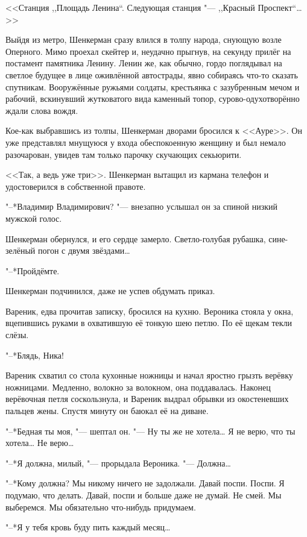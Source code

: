 <<Станция ,,Площадь Ленина``. Следующая станция "--- ,,Красный Проспект``\dots>>

Выйдя из метро, Шенкерман сразу влился в толпу народа, снующую возле Оперного.
Мимо проехал скейтер и, неудачно прыгнув, на секунду прилёг на постамент памятника Ленину.
Ленин же, как обычно, гордо поглядывал на светлое будущее в лице оживлённой автострады, явно собираясь что-то сказать спутникам.
Вооружённые ружьями солдаты, крестьянка с зазубренным мечом и рабочий, вскинувший жутковатого вида каменный топор, сурово-одухотворённо ждали слова вождя.

Кое-как выбравшись из толпы, Шенкерман дворами бросился к <<Ауре>>.
Он уже представлял мнущуюся у входа обеспокоенную женщину и был немало разочарован, увидев там только парочку скучающих секьюрити.

<<Так, а ведь уже три>>.
Шенкерман вытащил из кармана телефон и удостоверился в собственной правоте.

"--*Владимир Владимирович? "--- внезапно услышал он за спиной низкий мужской голос.

Шенкерман обернулся, и его сердце замерло.
Светло-голубая рубашка, сине-зелёный погон с двумя звёздами\dots{}

"--*Пройдёмте.

Шенкерман подчинился, даже не успев обдумать приказ.

\asterism

Вареник, едва прочитав записку, бросился на кухню.
Вероника стояла у окна, вцепившись руками в охватившую её тонкую шею петлю.
По её щекам текли слёзы.

"--*Блядь, Ника!

Вареник схватил со стола кухонные ножницы и начал яростно грызть верёвку ножницами.
Медленно, волокно за волокном, она поддавалась.
Наконец верёвочная петля соскользнула, и Вареник выдрал обрывки из окостеневших пальцев жены.
Спустя минуту он баюкал её на диване.

"--*Бедная ты моя, "--- шептал он.
"--- Ну ты же не хотела\dots{}
Я не верю, что ты хотела\dots{}
Не верю\dots{}

"--*Я должна, милый, "--- прорыдала Вероника.
"--- Должна\dots{}

"--*Кому должна?
Мы никому ничего не задолжали.
Давай поспи.
Поспи.
Я подумаю, что делать.
Давай, поспи и больше даже не думай.
Не смей.
Мы выберемся.
Мы обязательно что-нибудь придумаем.

"--*Я у тебя кровь буду пить каждый месяц\dots{}

